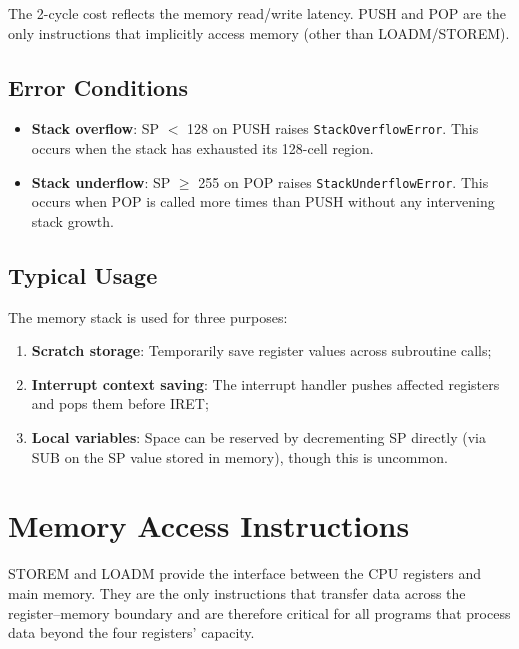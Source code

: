 \documentclass[10pt,a4paper,twoside]{book}
\begin{document}
The 2-cycle cost reflects the memory read/write latency. PUSH and POP are the only
instructions that implicitly access memory (other than LOADM/STOREM).

\section{Error Conditions}

\begin{itemize}
    \item \textbf{Stack overflow}: SP $<$ 128 on PUSH raises
          \texttt{StackOverflowError}. This occurs when the stack has exhausted its
          128-cell region.
    \item \textbf{Stack underflow}: SP $\ge$ 255 on POP raises
          \texttt{StackUnderflowError}. This occurs when POP is called more times
          than PUSH without any intervening stack growth.
\end{itemize}

\section{Typical Usage}

The memory stack is used for three purposes:
\begin{enumerate}
    \item \textbf{Scratch storage}: Temporarily save register values across
          subroutine calls;
    \item \textbf{Interrupt context saving}: The interrupt handler pushes affected
          registers and pops them before IRET;
    \item \textbf{Local variables}: Space can be reserved by decrementing SP
          directly (via SUB on the SP value stored in memory), though this is
          uncommon.
\end{enumerate}

\chapter{Memory Access Instructions}
\label{ch:memaccess}

STOREM and LOADM provide the interface between the CPU registers and main memory.
They are the only instructions that transfer data across the register--memory boundary
and are therefore critical for all programs that process data beyond the four
registers' capacity.
\end{document}
